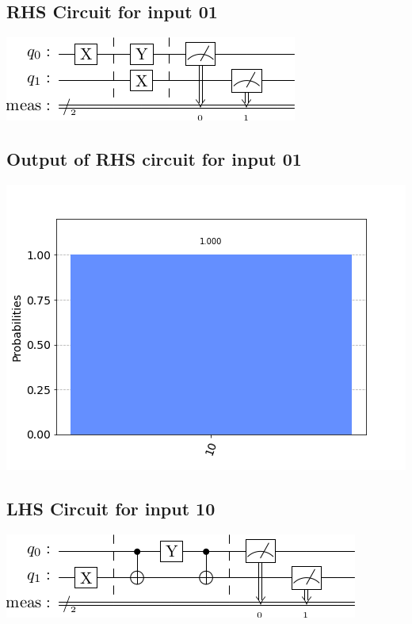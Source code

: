 \documentclass[a4paper]{article}
\begin{document}
\begin{answer}[Question 1 b (d)]
        \subsection*{RHS Circuit for input 01}
        \includegraphics[scale=0.5]{d201.png}
        \subsection*{Output of RHS circuit for input 01}
        \includegraphics[scale = 0.5]{d201-out.png}
        \subsection*{LHS Circuit for input 10}
        \includegraphics[scale=0.5]{d110.png}

\end{answer}
\end{document}
